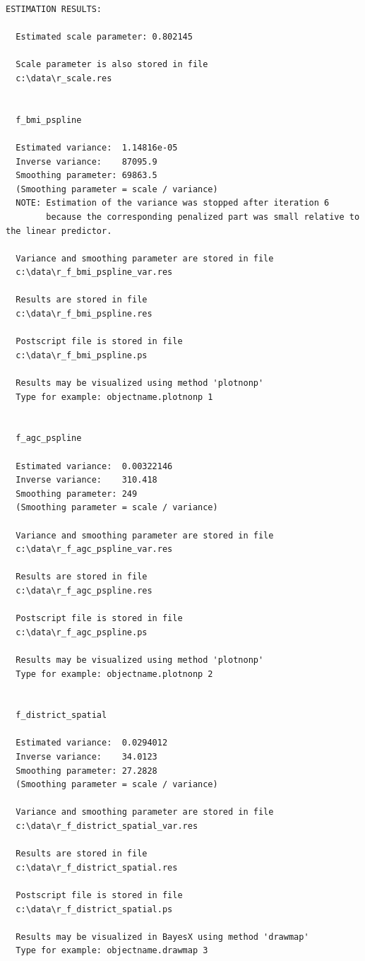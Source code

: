 \documentclass{article}
\begin{document}
\footnotesize
\begin{verbatim}
ESTIMATION RESULTS:

  Estimated scale parameter: 0.802145

  Scale parameter is also stored in file
  c:\data\r_scale.res


  f_bmi_pspline

  Estimated variance:  1.14816e-05
  Inverse variance:    87095.9
  Smoothing parameter: 69863.5
  (Smoothing parameter = scale / variance)
  NOTE: Estimation of the variance was stopped after iteration 6
        because the corresponding penalized part was small relative to the linear predictor.

  Variance and smoothing parameter are stored in file
  c:\data\r_f_bmi_pspline_var.res

  Results are stored in file
  c:\data\r_f_bmi_pspline.res

  Postscript file is stored in file
  c:\data\r_f_bmi_pspline.ps

  Results may be visualized using method 'plotnonp'
  Type for example: objectname.plotnonp 1


  f_agc_pspline

  Estimated variance:  0.00322146
  Inverse variance:    310.418
  Smoothing parameter: 249
  (Smoothing parameter = scale / variance)

  Variance and smoothing parameter are stored in file
  c:\data\r_f_agc_pspline_var.res

  Results are stored in file
  c:\data\r_f_agc_pspline.res

  Postscript file is stored in file
  c:\data\r_f_agc_pspline.ps

  Results may be visualized using method 'plotnonp'
  Type for example: objectname.plotnonp 2


  f_district_spatial

  Estimated variance:  0.0294012
  Inverse variance:    34.0123
  Smoothing parameter: 27.2828
  (Smoothing parameter = scale / variance)

  Variance and smoothing parameter are stored in file
  c:\data\r_f_district_spatial_var.res

  Results are stored in file
  c:\data\r_f_district_spatial.res

  Postscript file is stored in file
  c:\data\r_f_district_spatial.ps

  Results may be visualized in BayesX using method 'drawmap'
  Type for example: objectname.drawmap 3



\end{verbatim}
\end{document}
